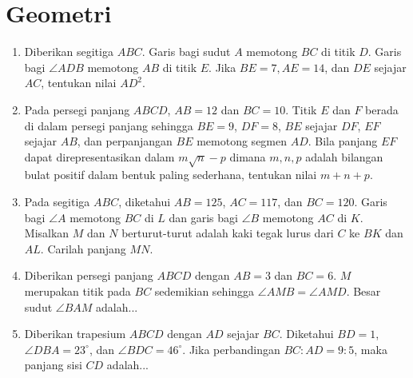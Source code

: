 \documentclass[12pt]{scrartcl}
\begin{document}
\section{Geometri}
\begin{enumerate}[resume]
		\item
		Diberikan segitiga $ABC$. Garis bagi sudut $A$ memotong $BC$ di titik $D$. Garis bagi
		$\angle ADB$ memotong $AB$ di titik $E$. Jika $BE = 7, AE = 14$, dan $DE$ sejajar $AC$,
		tentukan nilai $AD^2$.


		\item
		Pada persegi panjang $ABCD$, $AB = 12$ dan $BC=10$. Titik $E$ dan $F$ berada di dalam persegi panjang sehingga $BE=9$, $DF=8$, $BE$ sejajar $DF$, $EF$ sejajar $AB$, dan perpanjangan $BE$ memotong segmen $AD$. Bila panjang $EF$ dapat direpresentasikan dalam $m\sqrt n - p$ dimana $m,n,p$ adalah bilangan bulat positif dalam bentuk paling sederhana, tentukan nilai $m+n+p$.

	\item
	Pada segitiga $ABC$, diketahui $AB=125$, $AC=117$, dan $BC=120$. Garis bagi $\angle A$ memotong $BC$ di $L$ dan garis bagi $\angle B$ memotong $AC$ di $K$. Misalkan $M$ dan $N$ berturut-turut adalah kaki tegak lurus dari $C$ ke $BK$ dan $AL$. Carilah panjang $MN$.


		\item Diberikan persegi panjang $ABCD$ dengan $AB = 3$ dan $BC = 6$. $M$ merupakan titik pada $BC$ sedemikian sehingga $\angle AMB = \angle AMD$. Besar sudut $\angle BAM$ adalah...

  		\item
		Diberikan trapesium $ABCD$ dengan $AD$ sejajar $BC$. Diketahui $BD=1$, $\angle DBA = 23^\circ$, dan $\angle BDC = 46^\circ$. Jika perbandingan $BC:AD=9:5$, maka panjang sisi $CD$ adalah...
\end{enumerate}
	
	
\end{document}
